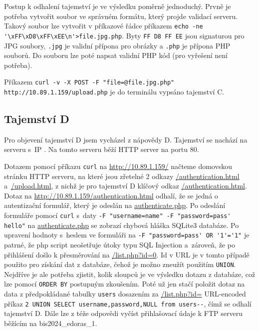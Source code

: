 \documentclass[a4paper, 11pt]{article}
\begin{document}
Postup k odhalení tajemství je ve výsledku poměrně jednoduchý. Prvně je potřeba vytvořit soubor ve správném formátu, který projde validací serveru. Takový soubor lze vytvořit v příkazové řádce příkazem \verb|echo -ne '\xFF\xD8\xFF\xEE\n'>file.jpg.php|. Byty \texttt{FF D8 FF EE} jsou signaturou pro JPG soubory, \texttt{.jpg} je validní přípona pro obrázky a \texttt{.php} je přípona PHP souborů. Do souboru lze poté napsat validní PHP kód (pro vyřešení není potřeba). 

Příkazem \verb|curl -v -X POST -F "file=@file.jpg.php" http://10.89.1.159/upload.php| je do terminálu vypsáno tajemství C.



\subsection{Tajemství D}
Pro objevení tajemství D jsem vycházel z nápovědy D. Tajemství se nachází na serveru  s~IP . Na tomto serveru běží HTTP server na portu 80. 

Dotazem pomocí příkazu \texttt{curl} na \url{http://10.89.1.159/} načteme domovskou stránku HTTP serveru, na které jsou zřetelné 2 odkazy \url{/authentication.html} a~\url{/upload.html}, z nichž je pro tajemství D klíčový odkaz \url{/authentication.html}. Dotaz na \url{http://10.89.1.159/authentication.html} odhalí, že se jedná o autentizační formulář, který je odeslán na \url{authenticate.php}. Po odeslání formuláře pomocí \texttt{curl} s~daty \verb|-F "username=name" -F "password=pass' hello"| na \url{authenticate.php} se zobrazí chybová hláška SQLite3 databáze. Po upravení hodnoty s~heslem ve formuláři na \linebreak \verb|-F "password=pass' OR '1'='1"| je patrné, že php script neošetřuje útoky typu SQL Injection a~zároveň, že po přihlášení došlo k přesměrování na \url{/list.php?id=0}. Id v URL je v tomto případě použito pro získání dat z databáze, čehož je možno zneužít použitím \verb|UNION|. Nejdříve je ale potřeba zjistit, kolik sloupců je ve výsledku dotazu z databáze, což lze pomocí \verb|ORDER BY| postupným zkoušením. Poté už jen stačí položit dotaz na data z předpokládané tabulky \verb|users| dosazením za \url{/list.php?id=} URL-encoded příkaz \linebreak \verb|2 UNION SELECT username,password,NULL from users--|, čímž se odhalí tajemství D. Dále lze z téže odpovědi vyčíst přihlašovací údaje k FTP serveru běžícím na bis2024\_edoras\_1.
\end{document}
